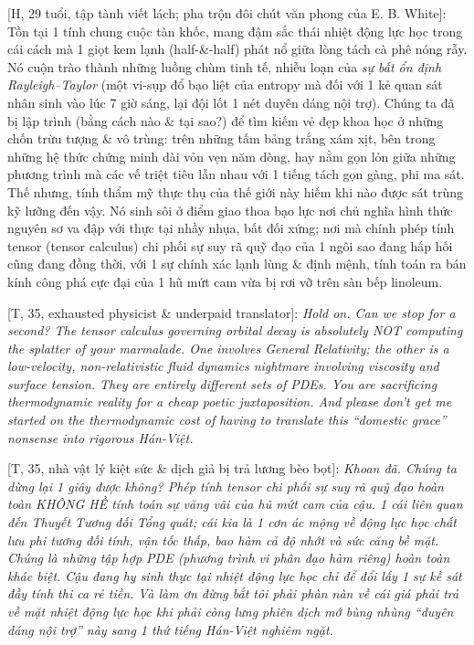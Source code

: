 \documentclass[11pt]{article}
\begin{document}
\textsf{[H, 29 tuổi, tập tành viết lách; pha trộn đôi chút văn phong của E. B. White]:} Tồn tại 1 tính chung cuộc tàn khốc, mang đậm sắc thái nhiệt động lực học trong cái cách mà 1 giọt kem lạnh (half-\&-half) phát nổ giữa lòng tách cà phê nóng rẫy. Nó cuộn trào thành những luồng chùm tinh tế, nhiễu loạn của \textit{sự bất ổn định Rayleigh--Taylor} (một vi-sụp đổ bạo liệt của entropy mà đối với 1 kẻ quan sát nhân sinh vào lúc 7 giờ sáng, lại đội lốt 1 nét duyên dáng nội trợ). Chúng ta đã bị lập trình (bằng cách nào \& tại sao?) để tìm kiếm vẻ đẹp khoa học ở những chốn trừu tượng \& vô trùng: trên những tấm bảng trắng xám xịt, bên trong những hệ thức chứng minh dài vỏn vẹn năm dòng, hay nằm gọn lỏn giữa những phương trình mà các vế triệt tiêu lẫn nhau với 1 tiếng tách gọn gàng, phi ma sát. Thế nhưng, tính thẩm mỹ thực thụ của thế giới này hiếm khi nào được sát trùng kỹ lưỡng đến vậy. Nó sinh sôi ở điểm giao thoa bạo lực nơi chủ nghĩa hình thức nguyên sơ va đập với thực tại nhầy nhụa, bất đối xứng; nơi mà chính phép tính tensor (tensor calculus) chi phối sự suy rã quỹ đạo của 1 ngôi sao đang hấp hối cũng đang đồng thời, với 1 sự chính xác lạnh lùng \& định mệnh, tính toán ra bán kính công phá cực đại của 1 hũ mứt cam vừa bị rơi vỡ trên sàn bếp linoleum.

\vspace{2mm}
\textsf{[T, 35, exhausted physicist \& underpaid translator]:} \textit{Hold on. Can we stop for a second? The tensor calculus governing orbital decay is absolutely NOT computing the splatter of your marmalade. One involves General Relativity; the other is a low-velocity, non-relativistic fluid dynamics nightmare involving viscosity and surface tension. They are entirely different sets of PDEs. You are sacrificing thermodynamic reality for a cheap poetic juxtaposition. And please don't get me started on the thermodynamic cost of having to translate this ``domestic grace'' nonsense into rigorous Hán-Việt.}

\textsf{[T, 35, nhà vật lý kiệt sức \& dịch giả bị trả lương bèo bọt]:} \textit{Khoan đã. Chúng ta dừng lại 1 giây được không? Phép tính tensor chi phối sự suy rã quỹ đạo hoàn toàn KHÔNG HỀ tính toán sự văng vãi của hũ mứt cam của cậu. 1 cái liên quan đến Thuyết Tương đối Tổng quát; cái kia là 1 cơn ác mộng về động lực học chất lưu phi tương đối tính, vận tốc thấp, bao hàm cả độ nhớt và sức căng bề mặt. Chúng là những tập hợp PDE (phương trình vi phân đạo hàm riêng) hoàn toàn khác biệt. Cậu đang hy sinh thực tại nhiệt động lực học chỉ để đổi lấy 1 sự kề sát đầy tính thi ca rẻ tiền. Và làm ơn đừng bắt tôi phải phàn nàn về cái giá phải trả về mặt nhiệt động lực học khi phải còng lưng phiên dịch mớ bùng nhùng ``duyên dáng nội trợ'' này sang 1 thứ tiếng Hán-Việt nghiêm ngặt.}
\vspace{2mm}
\end{document}
